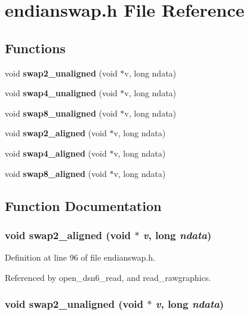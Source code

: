 \section{endianswap.h File Reference}
\label{endianswap_8h}
\subsection*{Functions}
\begin{CompactItemize}
\item 
void {\bf swap2\_\-unaligned} (void $\ast$v, long ndata)
\item 
void {\bf swap4\_\-unaligned} (void $\ast$v, long ndata)
\item 
void {\bf swap8\_\-unaligned} (void $\ast$v, long ndata)
\item 
void {\bf swap2\_\-aligned} (void $\ast$v, long ndata)
\item 
void {\bf swap4\_\-aligned} (void $\ast$v, long ndata)
\item 
void {\bf swap8\_\-aligned} (void $\ast$v, long ndata)
\end{CompactItemize}


\subsection{Function Documentation}
\subsubsection{\setlength{\rightskip}{0pt plus 5cm}void swap2\_\-aligned (void $\ast$ {\em v}, long {\em ndata})\hspace{0.3cm}{\tt  [static]}}\label{endianswap_8h_a3}




Definition at line 96 of file endianswap.h.

Referenced by open\_\-dsn6\_\-read, and read\_\-rawgraphics.
\subsubsection{\setlength{\rightskip}{0pt plus 5cm}void swap2\_\-unaligned (void $\ast$ {\em v}, long {\em ndata})\hspace{0.3cm}{\tt  [static]}}\label{endianswap_8h_a0}




